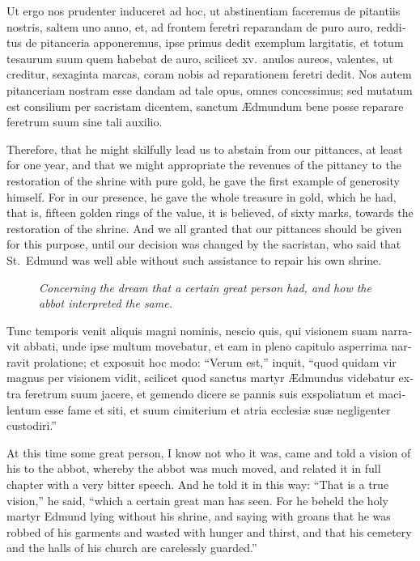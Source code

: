 \documentclass{book}
\newcommand{\blockhead}[4][]{
\begin{figure}
\centering
\vspace{#4}
\parbox{2.75cm}{\begin{center}\footnotesize \color{BrickRed} \emph{#2}\\ #1 \end{center}}
\end{figure}
}
\begin{document}
\begin{paracol}{2}
\switchcolumn*

\begin{otherlanguage}{latin}
Ut ergo nos prudenter induceret ad hoc, ut abstinentiam faceremus de pitantiis nostris, saltem uno anno, et, ad frontem feretri reparandam de puro auro, redditus de pitanceria apponeremus, ipse primus dedit exemplum largitatis, et totum tesaurum suum quem habebat de auro, scilicet xv.\ anulos aureos, valentes, ut creditur, sexaginta marcas, coram nobis ad reparationem feretri dedit. Nos autem pitanceriam nostram esse dandam ad tale opus, omnes concessimus; sed mutatum est consilium per sacristam dicentem, sanctum \AE{}dmundum bene posse reparare feretrum suum sine tali auxilio.
\end{otherlanguage}

\switchcolumn

Therefore, that he might skilfully lead us to abstain from our pittances, at least for one year, and that we might appropriate the revenues of the pittancy to the restoration of the shrine with pure gold, he gave the first example of generosity himself. For in our presence, he gave the whole treasure in gold, which he had, that is, fifteen golden rings of the value, it is believed, of sixty marks, towards the restoration of the shrine. And we all granted that our pittances should be given for this purpose, until our decision was changed by the sacristan, who said that St.\ Edmund was well able without such assistance to repair his own shrine.

\switchcolumn*

\begin{otherlanguage}{latin}
\blockhead{Concerning the dream that a certain great person had, and how the abbot interpreted the same.}{4}{-.65cm}
Tunc temporis venit aliquis magni nominis, nescio quis, qui visionem suam narravit abbati, unde ipse multum movebatur, et eam in pleno capitulo asperrima narravit prolatione; et exposuit hoc modo: ``Verum est,'' inquit, ``quod quidam vir magnus per visionem vidit, scilicet quod sanctus martyr \AE{}dmundus videbatur extra feretrum suum jacere, et gemendo dicere se pannis suis exspoliatum et macilentum esse fame et siti, et suum cimiterium et atria ecclesi\ae{} su\ae{} negligenter custodiri.''

\end{otherlanguage}

\switchcolumn

At this time some great person, I know not who it was, came and told a vision of his to the abbot, whereby the abbot was much moved, and related it in full chapter with a very bitter speech. And he told it in this way: ``That is a true vision,'' he said, ``which a certain great man has seen. For he beheld the holy martyr Edmund lying without his shrine, and saying with groans that he was robbed of his garments and wasted with hunger and thirst, and that his cemetery and the halls of his church are carelessly guarded.''


\end{paracol}
\end{document}
